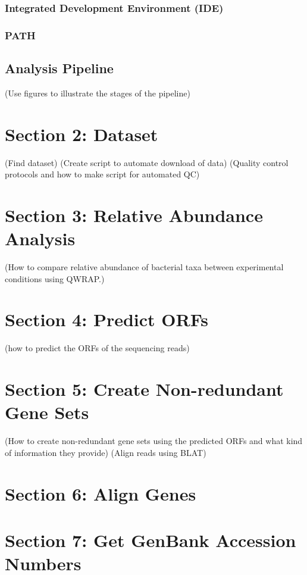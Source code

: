 \subsection{Integrated Development Environment (IDE)}
%
\subsection{PATH}
\section{Analysis Pipeline}
(Use figures to illustrate the stages of the pipeline)

\chapter{Section 2: Dataset}
(Find dataset)
(Create script to automate download of data)
(Quality control protocols and how to make script for automated QC)

\chapter{Section 3: Relative Abundance Analysis}
(How to compare relative abundance of bacterial taxa between experimental conditions using QWRAP.)

\chapter{Section 4: Predict ORFs}
(how to predict the ORFs of the sequencing reads)

\chapter{Section 5: Create Non-redundant Gene Sets}
(How to create non-redundant gene sets using the predicted ORFs and what kind of information they provide)
(Align reads using BLAT)

\chapter{Section 6: Align Genes}

\chapter{Section 7: Get GenBank Accession Numbers}

